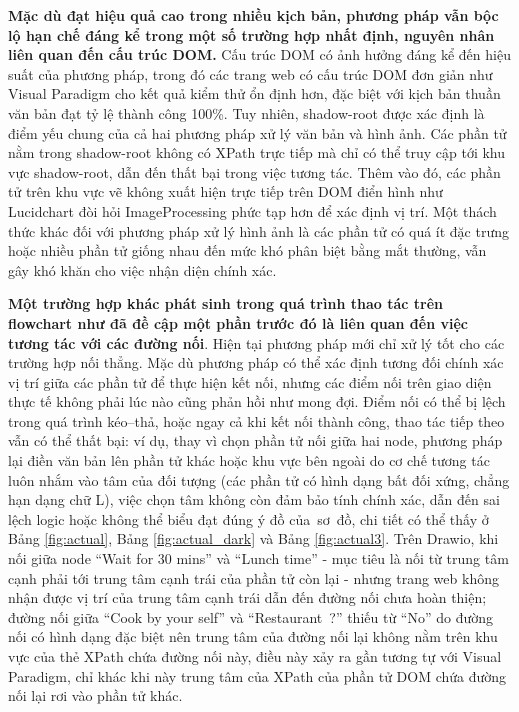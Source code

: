 \documentclass[a4paper, 12pt]{report}
\begin{document}
{\textbf{Mặc dù đạt hiệu quả cao trong nhiều kịch bản, phương pháp vẫn bộc lộ hạn chế đáng kể trong một số trường hợp nhất định, nguyên nhân liên quan đến cấu trúc DOM.} Cấu trúc DOM có ảnh hưởng đáng kể đến hiệu suất của phương pháp, trong đó các trang web có cấu trúc DOM đơn giản như Visual Paradigm cho kết quả kiểm thử ổn định hơn, đặc biệt với kịch bản thuần văn bản đạt tỷ lệ thành công 100\%. Tuy nhiên, shadow-root được xác định là điểm yếu chung của cả hai phương pháp xử lý văn bản và hình ảnh. Các phần tử nằm trong shadow-root không có XPath trực tiếp mà chỉ có thể truy cập tới khu vực shadow-root, dẫn đến thất bại trong việc tương tác. Thêm vào đó, các phần tử trên khu vực vẽ không xuất hiện trực tiếp trên DOM điển hình như Lucidchart đòi hỏi \gls{ImageProcessing} phức tạp hơn để xác định vị trí. Một thách thức khác đối với phương pháp xử lý hình ảnh là các phần tử có quá ít đặc trưng hoặc nhiều phần tử giống nhau đến mức khó phân biệt bằng mắt thường, vẫn gây khó khăn cho việc nhận diện chính xác.


\textbf{Một trường hợp khác phát sinh trong quá trình thao tác trên flowchart như đã đề cập một phần trước đó là liên quan đến việc tương tác với các đường nối}. Hiện tại phương pháp mới chỉ xử lý tốt cho các trường hợp nối thẳng. Mặc dù phương pháp có thể xác định tương đối chính xác vị trí giữa các phần tử để thực hiện kết nối, nhưng các điểm nối trên giao diện thực tế không phải lúc nào cũng phản hồi như mong đợi. Điểm nối có thể bị lệch trong quá trình kéo–thả, hoặc ngay cả khi kết nối thành công, thao tác tiếp theo vẫn có thể thất bại: ví dụ, thay vì chọn phần tử nối giữa hai node, phương pháp lại điền văn bản lên phần tử khác hoặc khu vực bên ngoài do cơ chế tương tác luôn nhắm vào tâm của đối tượng (các phần tử có hình dạng bất đối xứng, chẳng hạn dạng chữ L), việc chọn tâm không còn đảm bảo tính chính xác, dẫn đến sai lệch logic hoặc không thể biểu đạt đúng ý đồ của~sơ~đồ, chi tiết có thể thấy ở Bảng \ref{fig:actual}, Bảng \ref{fig:actual_dark} và Bảng \ref{fig:actual3}. Trên Drawio, khi nối giữa node ``Wait for 30 mins'' và ``Lunch time'' - mục tiêu là nối từ trung tâm cạnh phải tới trung tâm cạnh trái của phần tử còn lại - nhưng trang web không nhận được vị trí của trung tâm cạnh trái dẫn đến đường nối chưa hoàn thiện; đường nối giữa ``Cook by your self'' và ``Restaurant~?'' thiếu từ ``No'' do đường nối có hình dạng đặc biệt nên trung tâm của đường nối lại không nằm trên khu vực của thẻ XPath chứa đường nối này, điều này xảy ra gần tương tự với Visual Paradigm, chỉ khác khi này trung tâm của XPath của phần tử DOM chứa đường nối lại rơi vào phần tử khác.


}
\end{document}
